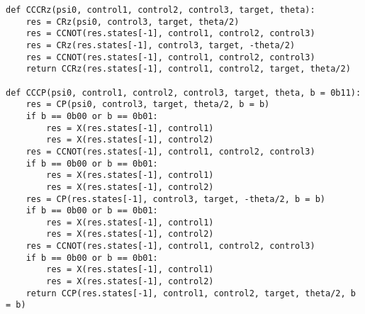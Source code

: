 \begin{verbatim}
def CCCRz(psi0, control1, control2, control3, target, theta):
    res = CRz(psi0, control3, target, theta/2)
    res = CCNOT(res.states[-1], control1, control2, control3)
    res = CRz(res.states[-1], control3, target, -theta/2)
    res = CCNOT(res.states[-1], control1, control2, control3)
    return CCRz(res.states[-1], control1, control2, target, theta/2)

def CCCP(psi0, control1, control2, control3, target, theta, b = 0b11):
    res = CP(psi0, control3, target, theta/2, b = b)
    if b == 0b00 or b == 0b01:
        res = X(res.states[-1], control1)
        res = X(res.states[-1], control2)
    res = CCNOT(res.states[-1], control1, control2, control3)
    if b == 0b00 or b == 0b01:
        res = X(res.states[-1], control1)
        res = X(res.states[-1], control2)
    res = CP(res.states[-1], control3, target, -theta/2, b = b)
    if b == 0b00 or b == 0b01:
        res = X(res.states[-1], control1)
        res = X(res.states[-1], control2)
    res = CCNOT(res.states[-1], control1, control2, control3)
    if b == 0b00 or b == 0b01:
        res = X(res.states[-1], control1)
        res = X(res.states[-1], control2)
    return CCP(res.states[-1], control1, control2, target, theta/2, b = b)

\end{verbatim}


